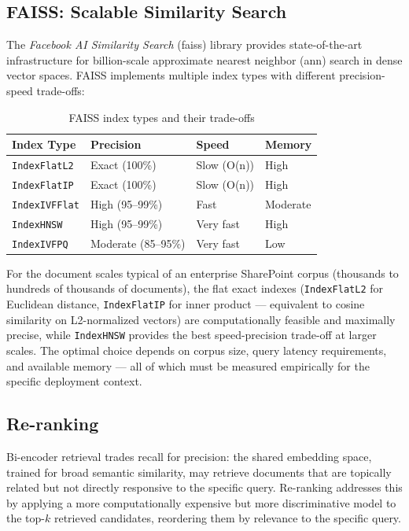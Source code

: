 \subsection{FAISS: Scalable Similarity Search}

The \textit{Facebook AI Similarity Search} (\gls{faiss}) library \citep{Johnson2019} provides state-of-the-art infrastructure for billion-scale approximate nearest neighbor (\gls{ann}) search in dense vector spaces. FAISS implements multiple index types with different precision-speed trade-offs:

\begin{table}[H]
\centering
\caption{FAISS index types and their trade-offs}
\label{tab:faiss-indexes}
\begin{tabular}{@{}llll@{}}
\toprule
\textbf{Index Type} & \textbf{Precision} & \textbf{Speed} & \textbf{Memory} \\
\midrule
\texttt{IndexFlatL2} & Exact (100\%) & Slow (O(n)) & High \\
\texttt{IndexFlatIP} & Exact (100\%) & Slow (O(n)) & High \\
\texttt{IndexIVFFlat} & High (95–99\%) & Fast & Moderate \\
\texttt{IndexHNSW} & High (95–99\%) & Very fast & High \\
\texttt{IndexIVFPQ} & Moderate (85–95\%) & Very fast & Low \\
\bottomrule
\end{tabular}
\end{table}

For the document scales typical of an enterprise SharePoint corpus (thousands to hundreds of thousands of documents), the flat exact indexes (\texttt{IndexFlatL2} for Euclidean distance, \texttt{IndexFlatIP} for inner product — equivalent to cosine similarity on L2-normalized vectors) are computationally feasible and maximally precise, while \texttt{IndexHNSW} provides the best speed-precision trade-off at larger scales. The optimal choice depends on corpus size, query latency requirements, and available memory — all of which must be measured empirically for the specific deployment context.

\subsection{Re-ranking}

Bi-encoder retrieval trades recall for precision: the shared embedding space, trained for broad semantic similarity, may retrieve documents that are topically related but not directly responsive to the specific query. Re-ranking addresses this by applying a more computationally expensive but more discriminative model to the top-$k$ retrieved candidates, reordering them by relevance to the specific query.

